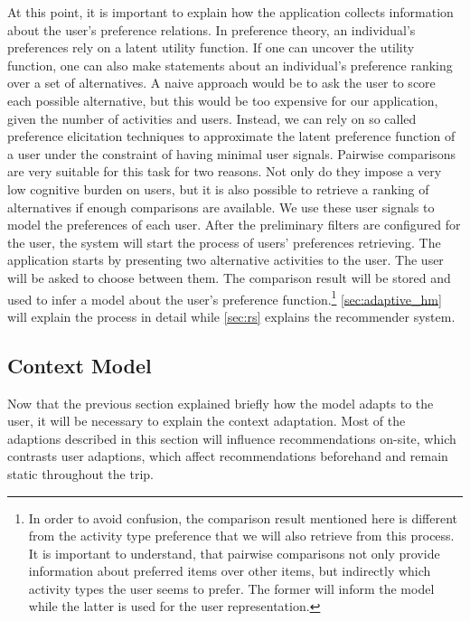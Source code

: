 \documentclass[11pt,a4paper,oneside]{article}
\begin{document}
At this point, it is important to explain how the application collects information about the user's preference relations. In preference theory, an individual's preferences rely on a latent utility function.\cite{chen_SurveyPreferenceElicitation_2004} If one can uncover the utility function, one can also make statements about an individual's preference ranking over a set of alternatives. A naive approach would be to ask the user to score each possible alternative, but this would be too expensive for our application, given the number of activities and users.\cite{chajewska_MakingRationalDecisions_2000} Instead, we can rely on so called preference elicitation techniques to approximate the latent preference function of a user under the constraint of having minimal user signals. Pairwise comparisons are very suitable for this task for two reasons. Not only do they impose a very low cognitive burden on users, but it is also possible to retrieve a ranking of alternatives if enough comparisons are available.\cite{conitzer_ElicitingSinglePeakedPreferences_2009} We use these user signals to model the preferences of each user. After the preliminary filters are configured for the user, the system will start the process of users' preferences retrieving. The application starts by presenting two alternative activities to the user. The user will be asked to choose between them. The comparison result will be stored and used to infer a model about the user's preference function.\footnote{In order to avoid confusion, the comparison result mentioned here is different from the activity type preference that we will also retrieve from this process. It is important to understand, that pairwise comparisons not only provide information about preferred items over other items, but indirectly which activity types the user seems to prefer. The former will inform the model while the latter is used for the user representation.} \autoref{sec:adaptive_hm} will explain the process in detail while \autoref{sec:rs} explains the recommender system. 


\subsection{Context Model}
\label{sec:context}
Now that the previous section explained briefly how the model adapts to the user, it will be necessary to explain the context adaptation. Most of the adaptions described in this section will influence recommendations on-site, which contrasts user adaptions, which affect recommendations beforehand and remain static throughout the trip.
\end{document}
